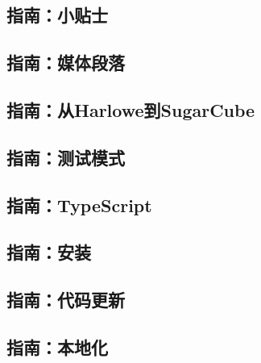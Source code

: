\documentclass[hyperref,UTF8]{ctexart}
\begin{document}
\newpage
\subsection{指南：小贴士}

\newpage
\subsection{指南：媒体段落}

\newpage
\subsection{指南：从Harlowe到SugarCube}

\newpage
\subsection{指南：测试模式}

\newpage
\subsection{指南：TypeScript}

\newpage
\subsection{指南：安装}

\newpage
\subsection{指南：代码更新}

\newpage
\subsection{指南：本地化}

\newpage
\nocite{SCv2Doc}
\printbibliography[title=参考文献]
\end{document}
